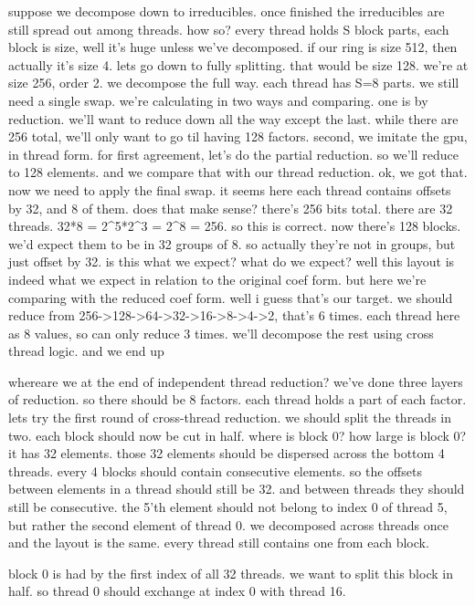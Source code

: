 suppose we decompose down to irreducibles.
once finished the irreducibles are still spread out among threads. how so? every thread holds S block parts, each block is size, well it's huge unless we've decomposed. if our ring is size 512, then actually it's size 4. lets go down to fully splitting. that would be size 128. 
we're at size 256, order 2. we decompose the full way. each thread has S=8 parts. we still need a single swap. 
we're calculating in two ways and comparing. one is by reduction. we'll want to reduce down all the way except the last. while there are 256 total, we'll only want to go til having 128 factors. second, we imitate the gpu, in thread form. 
for first agreement, let's do the partial reduction. so we'll reduce to 128 elements. and we compare that with our thread reduction.
ok, we got that. now we need to apply the final swap. 
it seems here each thread contains offsets by 32, and 8 of them. 
does that make sense? there's 256 bits total. there are 32 threads.
32*8 = 2^5*2^3 = 2^8 = 256. so this is correct. 
now there's 128 blocks. we'd expect them to be in 32 groups of 8. 
so actually they're not in groups, but just offset by 32. is this what we expect? what do we expect? well this layout is indeed what we expect in relation to the original coef form. but here we're comparing with the reduced coef form. well i guess that's our target.
we should reduce from 256->128->64->32->16->8->4->2, that's 6 times. each thread here as 8 values, so can only reduce 3 times. we'll decompose the rest using cross thread logic. 
and we end up 

whereare we at the end of independent thread reduction?
we've done three layers of reduction. so there should be 8 factors. each thread holds a part of each factor.
lets try the first round of cross-thread reduction. we should split the threads in two. each block should now be cut in half. where is block 0? how large is block 0? it has 32 elements. those 32 elements should be dispersed across the bottom 4 threads. 
every 4 blocks should contain consecutive elements. so the offsets between elements in a thread should still be 32. and between threads they should still be consecutive. the 5'th element should not belong to index 0 of thread 5, but rather the second element of thread 0. 
we decomposed across threads once and the layout is the same. every thread still contains one from each block. 

block 0 is had by the first index of all 32 threads. 
we want to split this block in half. 
so thread 0 should exchange at index 0 with thread 16. 

